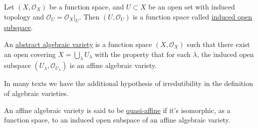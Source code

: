 \begin{dang}
    \begin{definition}
        Let $(X,\mathcal{O}_X)$ be a function space, and $U\subset X$ be an open set with induced topology and 
        $\mathcal{O}_U=\mathcal{O}_X|_U$. Then $(U,\mathcal{O}_U)$ is a function space called 
        \underline{induced open subspace}.
    \end{definition}
\end{dang}

\begin{dang}
    \begin{definition}
        An \underline{abstract algebraic variety} is a function space $(X,\mathcal{O}_X)$ such that there exist an open covering  
        $X=\bigcup_\lambda U_\lambda$ with the property that for each $\lambda$, the induced 
        open subspace $(U_\lambda,\mathcal{O}_{U_\lambda})$ is an affine algebraic variety.
    \end{definition}
\end{dang}

\begin{dang}
    \begin{remark}
    In many texts we have the additional hypothesis of irredutibility in the definition of algebraic varieties.
\end{remark}
\end{dang}

\begin{dang}
    \begin{definition}
        An affine algebraic variety is said to be \underline{quasi-affine} if it's isomorphic, as a function space, 
        to an induced open subspace of an affine algebraic variety.
    \end{definition}
\end{dang}


